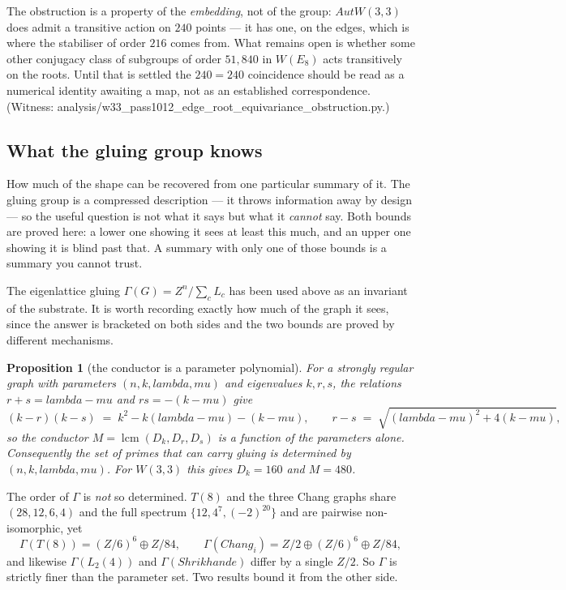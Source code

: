 \documentclass[12pt,a4paper]{article}
\def\mathbb#1{#1}%
\def\mathrm#1{#1}%
\def\texttt#1{#1}%
\def\text#1{#1}%
\def\lambda{lambda}%
\def\mu{mu}%
\newtheorem{proposition}[theorem]{Proposition}
\theoremstyle{definition}
\newcommand{\Aut}{\mathrm{Aut}}
\newcommand{\ZZ}{\mathbb{Z}}
\begin{document}
The obstruction is a property of the \emph{embedding}, not of the group:
$\Aut W(3,3)$ does admit a transitive action on $240$ points --- it has one, on
the edges, which is where the stabiliser of order $216$ comes from. What remains
open is whether some other conjugacy class of subgroups of order $51{,}840$ in
$W(E_8)$ acts transitively on the roots. Until that is settled the $240=240$
coincidence should be read as a numerical identity awaiting a map, not as an
established correspondence. (Witness:
\texttt{analysis/w33\_pass1012\_edge\_root\_equivariance\_obstruction.py}.)

\subsection*{What the gluing group knows}

\begin{plainbox}
How much of the shape can be recovered from one particular summary of it. The
gluing group is a compressed description --- it throws information away by design --- so
the useful question is not what it says but what it \emph{cannot} say. Both bounds are
proved here: a lower one showing it sees at least this much, and an upper one showing it
is blind past that. A summary with only one of those bounds is a summary you cannot
trust.
\end{plainbox}


The eigenlattice gluing $\Gamma(G) = \ZZ^n/\sum_c L_c$ has been used above as an
invariant of the substrate. It is worth recording exactly how much of the graph
it sees, since the answer is bracketed on both sides and the two bounds are
proved by different mechanisms.

\begin{proposition}[the conductor is a parameter polynomial]
\label{prop:conductor-parameters}
For a strongly regular graph with parameters $(n,k,\lambda,\mu)$ and eigenvalues
$k,r,s$, the relations $r+s = \lambda-\mu$ and $rs = -(k-\mu)$ give
\[
  (k-r)(k-s) \;=\; k^2 - k(\lambda-\mu) - (k-\mu),
  \qquad
  r-s \;=\; \sqrt{(\lambda-\mu)^2 + 4(k-\mu)},
\]
so the conductor $M = \operatorname{lcm}(D_k,D_r,D_s)$ is a function of the
parameters alone. Consequently the set of primes that can carry gluing is
determined by $(n,k,\lambda,\mu)$. For $W(3,3)$ this gives $D_k = 160$ and
$M = 480$.
\end{proposition}

The order of $\Gamma$ is \emph{not} so determined. $T(8)$ and the three Chang
graphs share $(28,12,6,4)$ and the full spectrum $\{12,4^7,(-2)^{20}\}$ and are
pairwise non-isomorphic, yet
\[
  \Gamma(T(8)) = (\ZZ/6)^6\oplus\ZZ/84,
  \qquad
  \Gamma(\mathrm{Chang}_i) = \ZZ/2\oplus(\ZZ/6)^6\oplus\ZZ/84 ,
\]
and likewise $\Gamma(L_2(4))$ and $\Gamma(\text{Shrikhande})$ differ by a single
$\ZZ/2$. So $\Gamma$ is strictly finer than the parameter set. Two results bound
it from the other side.
\end{document}
